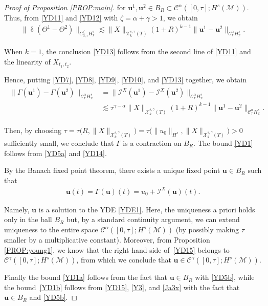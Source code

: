\documentclass[letterpaper, 11pt,  reqno]{amsart}
\newcommand{\1}{\hspace{0.5mm}\text{I}\hspace{0.5mm}}
\newcommand{\I}{\mathcal{I}}
\newcommand{\noi}{\noindent}
\newcommand{\CC}{\mathcal{C}}
\newcommand{\al}{\alpha}
\newcommand{\updl}{\updelta}
\newcommand{\g}{\gamma}
\newcommand{\G}{\Gamma}
\newcommand{\les}{\lesssim}
\newcommand{\M}{\mathcal{M}}
\newcommand{\cC}{\mathcal{C}}
\newcommand{\cX}{\mathcal{X}}
\newcommand{\uu}{\mathbf{u}}
\newcommand{\z}{\zeta}
\newcommand{\Ta}{\Theta}
\numberwithin{equation}{section}
\numberwithin{theorem}{section}
\begin{document}
\begin{proof}[Proof of Proposition \ref{PROP:main}]
\noi
for 
 $\uu^1, \uu^2 \in B_R\subset \cC^\al([0, \tau]; H^s(\M))$.
Thus, from \eqref{YD11} and \eqref{YD12} with $\z = \al + \g > 1$, we obtain
\begin{align}
\label{YD13}
\| \updl (\Theta^1 - \Ta^2)\|_{C^\z_{3,\tau} H^s_x}
\les 
\|X\|_{\cX^{s, \g}_k(T)}  (1+R)^{k-1}\|\uu^1- \uu^2 \|_{\CC^\al _\tau H^s_x}.
\end{align}


\noi
When $k = 1$, the conclusion \eqref{YD13}
follows from the second line of \eqref{YD11} and the linearity of $X_{t_1, t_2}$.



Hence, putting
\eqref{YD7}, \eqref{YD8}, 
\eqref{YD9}, \eqref{YD10}, and \eqref{YD13}
together, 
we obtain
\begin{align}
\begin{split}
\|\G(\uu^1)- \G(\uu^2)\|_{\cC^\al _{\tau} H^s_x}
& = 
\|\I^X(\uu^1)- \I^X(\uu^2)\|_{\CC^\al_{\tau}H^s_x}\\
&  \les 
\tau^{\g - \al}\|X\|_{\cX^{s, \g}_k(T)}  (1+R)^{k-1}\|\uu^1- \uu^2 \|_{\CC^\al _\tau H^s_x}.
\end{split}
\label{YD14}
\end{align}

\noi
Then, by 
 choosing 
$\tau = 
\tau\big(R, \|X\|_{\cX^{s, \g}_k(T)}\big) 
= 
\tau\big(\|u_0\|_{H^s}, \|X\|_{\cX^{s, \g}_k(T)}\big) >0$
sufficiently small, 
we conclude that $\G$ is a contraction on $B_R$.
The bound \eqref{YD1} follows from \eqref{YD5a} and \eqref{YD14}.


By the Banach fixed point theorem, 
there exists a unique fixed point $\uu \in B_R$
such that 
\begin{align}
\uu (t)= \G(\uu)(t) = u_0 + \I^X(\uu)(t).
\label{YD15}
\end{align}

\noi
Namely, 
$\uu$ is a solution to the YDE \eqref{YDE1}.
Here, the uniqueness a priori holds only in the ball $B_R$
but, by a standard continuity argument, 
we can extend uniqueness to the entire space $\CC^\al([0, \tau]; H^s(\M))$
(by possibly making $\tau$ smaller by a multiplicative constant).
Moreover,  from Proposition \ref{PROP:young1}, 
we know that the right-hand side of~\eqref{YD15}
belongs to $\CC^\g([0, \tau]; H^s(\M))$, 
from which we conclude that $\uu \in \CC^\g([0, \tau]; H^s(\M))$.

Finally the bound \eqref{YD1a}
follows from the fact that $\uu \in B_R$ with \eqref{YD5b}, 
while 
 the bound~\eqref{YD1b}
follows from 
\eqref{YD15}, 
\eqref{Y3}, and  \eqref{Ja3x} 
with the fact that $\uu \in B_R$ and \eqref{YD5b}.



\end{proof}
\end{document}
